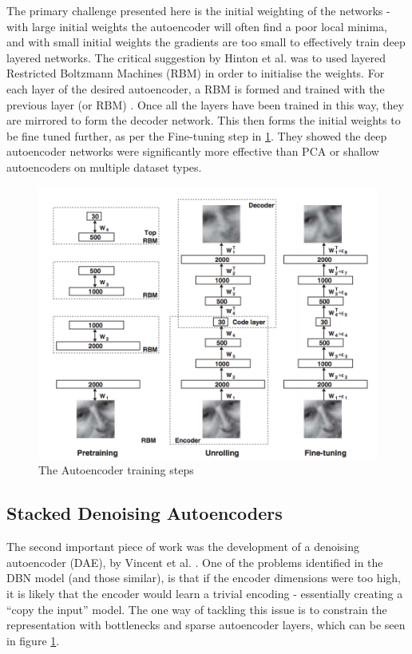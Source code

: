 \documentclass[a4paper,latin]{paper}
\begin{document}
The primary challenge presented here is the initial weighting of the networks - with large initial weights the 
autoencoder will often find a poor local minima, and with small initial weights the gradients are too small to 
effectively train deep layered networks. The critical suggestion by Hinton et al. was to used layered Restricted 
Boltzmann Machines (RBM) in order to initialise the weights. For each layer of the desired autoencoder, a RBM is 
formed and trained with the previous layer (or RBM) \cite{Hinton3}. Once all the layers have been 
trained in this way, they are mirrored to form the decoder network. This then forms the initial weights to be fine 
tuned further, as per the Fine-tuning step in \ref{figure-DBN-RBM}. They showed the deep autoencoder networks were significantly more 
effective than PCA or shallow autoencoders on multiple dataset types. 
 \hfill \break 
 
\begin{figure}
\centering \includegraphics[scale=0.5]{images/DBN-RBM-process.png}
 \caption{The Autoencoder training steps \cite{Hinton2}}
 \label{figure-DBN-RBM}
 \end{figure}
 
 \subsection {Stacked Denoising Autoencoders}\label{SDAE}

 The second important piece of work was the development of a denoising autoencoder (DAE), by Vincent  et al. \cite{Vincent}. 
 One of the problems identified in the DBN model (and those similar), is that if the encoder dimensions were too high, 
 it is likely that the encoder would learn a trivial encoding - essentially creating a “copy the input” model. The one way
  of tackling this issue is to constrain the representation with bottlenecks and sparse autoencoder layers, which can be seen in figure  \ref{figure-DBN-RBM}.
  \hfill \break 
\end{document}
